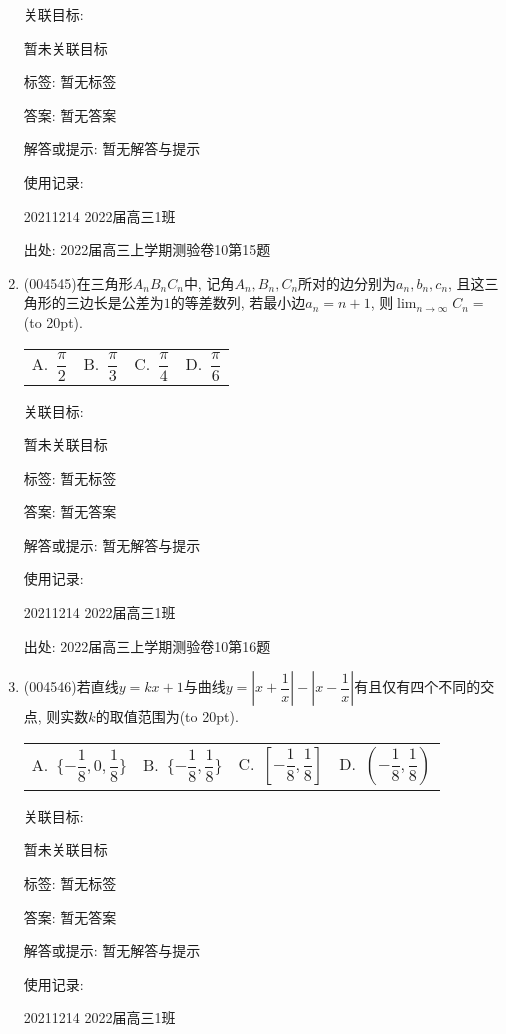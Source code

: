 \documentclass[10pt,a4paper]{article}
\newcommand{\bracket}[1]{(\hbox to #1pt{})}
\newcommand{\fourch}[4]{\par\begin{tabular}{p{.23\textwidth}p{.23\textwidth}p{.23\textwidth}p{.23\textwidth}}
A.~#1 &B.~#2& C.~#3& D.~#4
\end{tabular}}
\begin{document}
\begin{enumerate}[1.]
关联目标:

暂未关联目标



标签: 暂无标签

答案: 暂无答案

解答或提示: 暂无解答与提示

使用记录:

20211214	2022届高三1班	


出处: 2022届高三上学期测验卷10第15题
\item { (004545)}在三角形$A_nB_nC_n$中, 记角$A_n,B_n,C_n$所对的边分别为$a_n,b_n,c_n$, 且这三角形的三边长是公差为$1$的等差数列, 若最小边$a_n=n+1$, 则$\displaystyle\lim_{n\to \infty} C_n=$\bracket{20}.
\fourch{$\dfrac \pi 2$}{$\dfrac \pi 3$}{$\dfrac \pi 4$}{$\dfrac \pi 6$}


关联目标:

暂未关联目标



标签: 暂无标签

答案: 暂无答案

解答或提示: 暂无解答与提示

使用记录:

20211214	2022届高三1班	


出处: 2022届高三上学期测验卷10第16题
\item { (004546)}若直线$y=kx+1$与曲线$y=|x+\dfrac 1x|-|x-\dfrac 1x|$有且仅有四个不同的交点, 则实数$k$的取值范围为\bracket{20}.
\fourch{$\{-\dfrac 18,0,\dfrac 18\}$}{$\{-\dfrac 18,\dfrac 18\}$}{$[-\dfrac 18,\dfrac 18]$}{$(-\dfrac 18,\dfrac 18)$}


关联目标:

暂未关联目标



标签: 暂无标签

答案: 暂无答案

解答或提示: 暂无解答与提示

使用记录:

20211214	2022届高三1班		



\end{enumerate}
\end{document}
